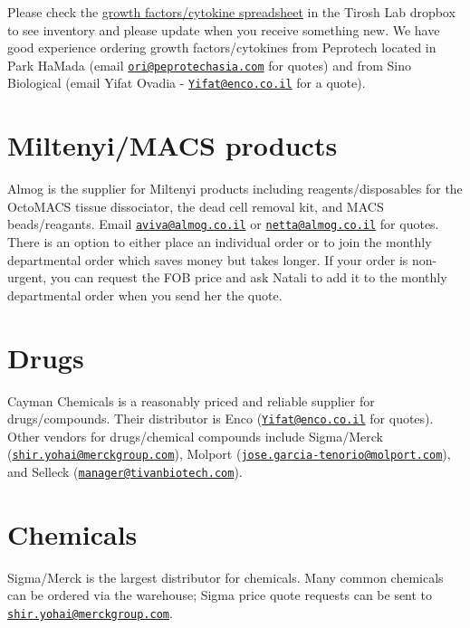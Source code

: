 \documentclass[
]{book}
\begin{document}
Please check the \href{https://www.dropbox.com/s/q0dn3a3th12y822/cytokines_GFs_Tirosh.xlsx?dl=0}{growth factors/cytokine spreadsheet} in the Tirosh Lab dropbox to see inventory and please update when you receive something new. We have good experience ordering growth factors/cytokines from Peprotech located in Park HaMada (email \href{mailto:ori@peprotechasia.com}{\nolinkurl{ori@peprotechasia.com}} for quotes) and from Sino Biological (email Yifat Ovadia - \href{mailto:Yifat@enco.co.il}{\nolinkurl{Yifat@enco.co.il}} for a quote).

\hypertarget{miltenyimacs-products}{%
\section{Miltenyi/MACS products}\label{miltenyimacs-products}}

Almog is the supplier for Miltenyi products including reagents/disposables for the OctoMACS tissue dissociator, the dead cell removal kit, and MACS beads/reagants. Email \href{mailto:aviva@almog.co.il}{\nolinkurl{aviva@almog.co.il}} or \href{mailto:netta@almog.co.il}{\nolinkurl{netta@almog.co.il}} for quotes. There is an option to either place an individual order or to join the monthly departmental order which saves money but takes longer. If your order is non-urgent, you can request the FOB price and ask Natali to add it to the monthly departmental order when you send her the quote.

\hypertarget{drugs}{%
\section{Drugs}\label{drugs}}

Cayman Chemicals is a reasonably priced and reliable supplier for drugs/compounds. Their distributor is Enco (\href{mailto:Yifat@enco.co.il}{\nolinkurl{Yifat@enco.co.il}} for quotes). Other vendors for drugs/chemical compounds include Sigma/Merck (\href{mailto:shir.yohai@merckgroup.com}{\nolinkurl{shir.yohai@merckgroup.com}}), Molport (\href{mailto:jose.garcia-tenorio@molport.com}{\nolinkurl{jose.garcia-tenorio@molport.com}}), and Selleck (\href{mailto:manager@tivanbiotech.com}{\nolinkurl{manager@tivanbiotech.com}}).

\hypertarget{chemicals}{%
\section{Chemicals}\label{chemicals}}

Sigma/Merck is the largest distributor for chemicals. Many common chemicals can be ordered via the warehouse; Sigma price quote requests can be sent to \href{mailto:shir.yohai@merckgroup.com}{\nolinkurl{shir.yohai@merckgroup.com}}.
\end{document}
